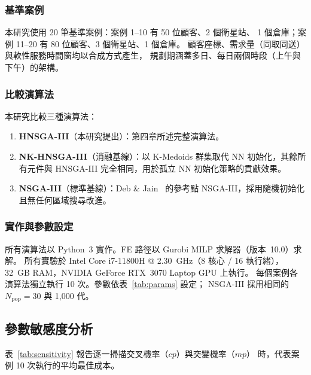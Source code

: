 \documentclass[11pt, a4paper]{article}
\numberwithin{equation}{section}
\begin{document}
\subsubsection{基準案例}

本研究使用 20 筆基準案例：案例 1--10 有 50 位顧客、2 個衛星站、
1 個倉庫；案例 11--20 有 80 位顧客、3 個衛星站、1 個倉庫。
顧客座標、需求量（同取同送）與軟性服務時間窗均以合成方式產生，
規劃期涵蓋多日、每日兩個時段（上午與下午）的架構。

\subsubsection{比較演算法}

本研究比較三種演算法：
\begin{enumerate}
  \item \textbf{HNSGA-III}（本研究提出）：第四章所述完整演算法。
  \item \textbf{NK-HNSGA-III}（消融基線）：以 K-Medoids 群集取代 NN
        初始化，其餘所有元件與 HNSGA-III 完全相同，用於孤立
        NN 初始化策略的貢獻效果。
  \item \textbf{NSGA-III}（標準基線）：Deb \& Jain~\cite{deb2014nsga3}
        的參考點 NSGA-III，採用隨機初始化且無任何區域搜尋改進。
\end{enumerate}

\subsubsection{實作與參數設定}

所有演算法以 Python~3 實作。FE 路徑以 Gurobi MILP 求解器（版本~10.0）求解。
所有實驗於 Intel Core i7-11800H @ 2.30~GHz（8 核心 / 16 執行緒），
32~GB RAM，NVIDIA GeForce RTX~3070 Laptop GPU 上執行。
每個案例各演算法獨立執行 10 次。參數依表~\ref{tab:params} 設定；
NSGA-III 採用相同的 $N_{\mathrm{pop}}=30$ 與 1{,}000 代。

\subsection{參數敏感度分析}

表~\ref{tab:sensitivity} 報告逐一掃描交叉機率（$cp$）與突變機率（$mp$）
時，代表案例 10 次執行的平均最佳成本。
\end{document}
